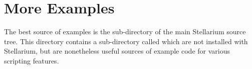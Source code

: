 \section{More Examples}
\label{sec:scripting:examples}
The best source of examples is the  sub-directory of the
main Stellarium source tree. This directory contains a sub-directory
called  which are not installed with Stellarium, but are
nonetheless useful sources of example code for various scripting
features.




